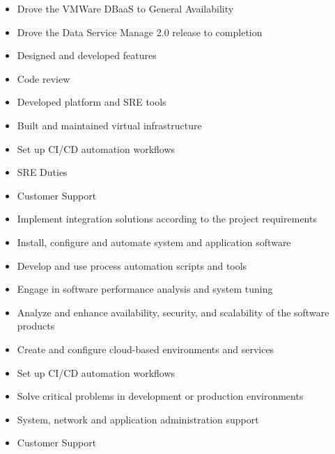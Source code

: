 \documentclass[10pt,a4paper,ragged2e,withhyper]{altacv}
\begin{document}


\makecvheader



\begin{itemize}
\item Drove the VMWare DBaaS to General Availability
\item Drove the Data Service Manage 2.0 release to completion
\item Designed and developed features
\item Code review
\item Developed platform and SRE tools
\item Built and maintained virtual infrastructure
\item Set up CI/CD automation workflows
\item SRE Duties
\item Customer Support
\end{itemize}
\divider

\begin{itemize}
\item Implement integration solutions according to the project requirements
\item Install, configure and automate system and application software
\item Develop and use process automation scripts and tools
\item Engage in software performance analysis and system tuning
\item Analyze and enhance availability, security, and scalability of the software products
\item Create and configure cloud-based environments and services
\item Set up CI/CD automation workflows
\item Solve critical problems in development or production environments
\item System, network and application administration support
\item Customer Support
\end{itemize}
\divider
\end{document}
